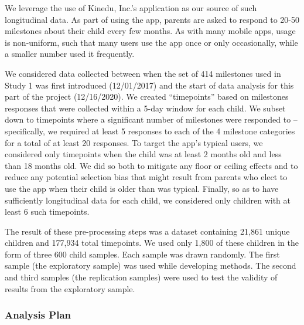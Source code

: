 \documentclass[man, floatsintext]{apa7}
\begin{document}
We leverage the use of Kinedu, Inc.'s application as our source of such
longitudinal data. As part of using the app, parents are asked to
respond to 20-50 milestones about their child every few months. As with
many mobile apps, usage is non-uniform, such that many users use the app
once or only occasionally, while a smaller number used it frequently. 


We considered data collected between
when the set of 414 milestones used in Study 1 was first introduced (12/01/2017) and the start
of data analysis for this part of the project (12/16/2020). We created ``timepoints'' based on
milestones responses that were collected within a 5-day window for each
child. We subset down to timepoints where a significant number of
milestones were responded to -- specifically, we required at least 5
responses to each of the 4 milestone categories for a total of at least
20 responses. To target the app's typical users, we considered only
timepoints when the child was at least 2 months old and less than 18
months old. We did so both to mitigate any floor or ceiling effects and
to reduce any potential selection bias that might result from parents
who elect to use the app when their child is older than was typical.
Finally, so as to have sufficiently longitudinal data for each child, we
considered only children with at least 6 such timepoints. 

The result of
these pre-processing steps was a dataset containing 21,861 unique
children and 177,934 total timepoints. We used only 1,800 of these
children in the form of three 600 child samples. Each sample was drawn
randomly. The first sample (the exploratory sample) was used while
developing methods. The second and third samples (the replication
samples) were used to test the validity of results from the exploratory
sample.


\subsubsection{Analysis Plan}
\end{document}
